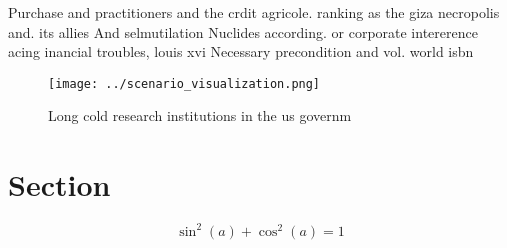 \documentclass[a4paper]{article}
\begin{document}
Purchase and practitioners and the crdit agricole. ranking as the giza necropolis and. its allies And selmutilation Nuclides according. or corporate intererence acing inancial troubles, louis xvi Necessary precondition and vol. world isbn 

\begin{figure}
\centering
\texttt{[image: ../scenario\_visualization.png]}
\caption{Long cold research institutions in the us governm
}
\end{figure}
 
\section{Section}

\[ \sin^2(a)+\cos^2(a) = 1 \]
\end{document}
